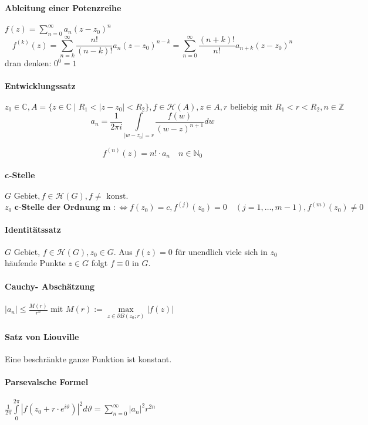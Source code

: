 \documentclass[a4paper, 10pt, DIV20, headings=small]{scrartcl}
\theoremstyle{definition}
\theoremstyle{plain}
\begin{document}
\paragraph{Ableitung einer Potenzreihe} $f(z) = \sum\limits_{n=0}^{\infty}{a_n (z-z_0)^n}$
$$f^{(k)}(z) = \sum\limits_{n=k}^{\infty}{\frac{n!}{(n-k)!} a_n (z-z_0)^{n-k}} = \sum\limits_{n=0}^{\infty}{\frac{(n+k)!}{n!} a_{n+k} (z-z_0)^n}$$
dran denken: $0^0 = 1$

\paragraph{Entwicklungssatz}
$z_0 \in \mathbb{C}, A = \{z \in \mathbb{C} \mid R_1 < |z-z_0| < R_2 \}, f \in \mathcal{H}(A), z \in A, r \text{ beliebig mit } R_1 < r < R_2, n \in \mathbb{Z}$
$$a_n = \frac{1}{2 \pi i} \int\limits_{|w-z_0| = r} {\frac{f(w)}{(w-z)^{n+1}} dw}$$

$$f^{(n)}(z) = n! \cdot a_n \quad n \in \mathbb{N}_0$$

\paragraph{c-Stelle}
$G \text{ Gebiet}, f \in \mathcal{H}(G), f \neq \text{ konst.}$
$$z_0 \textbf{ c-Stelle der Ordnung m } :\Leftrightarrow f(z_0) = c, f^{(j)}(z_0) = 0 \quad (j = 1, \ldots, m-1), f^{(m)}(z_0) \neq 0$$

\paragraph{Identitätssatz}
$G$ Gebiet, $f \in \mathcal{H}(G), z_0 \in G$.
Aus $f(z)=0$ für unendlich viele sich in $z_0$ häufende Punkte $z \in G$ folgt $f \equiv 0$ in $G$.

\paragraph{Cauchy- Abschätzung}
$|a_n| \leq \frac{M(r)}{r^n} \text{ mit } M(r) := \max\limits_{z \in \partial B(z_0;r)}{|f(z)|}$

\paragraph{Satz von Liouville}
Eine beschränkte ganze Funktion ist konstant.

\paragraph{Parsevalsche Formel}
$\frac{1}{2 \pi} \int\limits_{0}^{2 \pi}{|f(z_0 + r \cdot e^{i \vartheta})|^2 d \vartheta = \sum\limits_{n=0}^\infty |a_n|^2 r^{2n}}$
\end{document}
